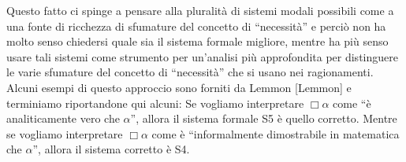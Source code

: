 \documentclass[a4paper, 12pt]{article}
\begin{document}
Questo fatto ci spinge a pensare alla pluralità di sistemi modali possibili
come a una fonte di ricchezza di sfumature del concetto di ``necessità'' e perciò non ha molto
senso chiedersi quale sia il sistema formale migliore, mentre ha più senso usare tali sistemi
come strumento per un'analisi più approfondita per distinguere le varie sfumature del concetto
di ``necessità'' che si usano nei ragionamenti.
Alcuni esempi di questo approccio sono forniti da Lemmon [Lemmon] e terminiamo riportandone qui alcuni:
Se vogliamo interpretare $\Box \alpha$ come ``è analiticamente vero che $\alpha$'', allora il sistema
formale S5 è quello corretto. Mentre se vogliamo interpretare $\Box \alpha$ come
è ``informalmente dimostrabile in matematica che $\alpha$'', allora il sistema corretto è S4.
\end{document}
